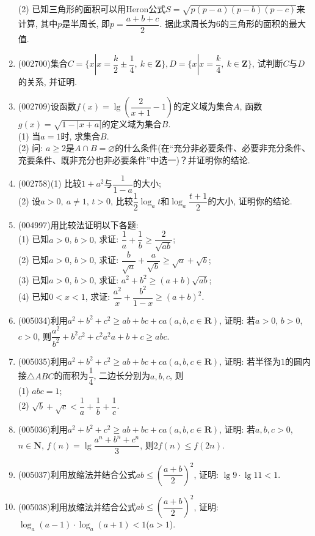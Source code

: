 \documentclass[10pt,a4paper]{article}
\begin{document}
\begin{enumerate}[1.]
(2) 已知三角形的面积可以用Heron公式$S=\sqrt{p(p-a)(p-b)(p-c)}$来计算, 其中$p$是半周长, 即$p=\dfrac{a+b+c}{2}$. 据此求周长为$6$的三角形的面积的最大值.
\item {\tiny (002700)}集合$C=\{x|x=\dfrac k2\pm \dfrac14, \ k\in \mathbf{Z}\},D=\{x|x=\dfrac k4,\ k\in \mathbf{Z}\}$, 试判断$C$与$D$的关系, 并证明.
\vspace*{24ex}
\item {\tiny (002709)}设函数$f(x)=\lg (\dfrac2{x+1}-1)$的定义域为集合$A$, 函数$g(x)=\sqrt{1-|x+a|}$的定义域为集合$B$.\\
(1) 当$a=1$时, 求集合$B$.\\
(2) 问: $a\ge 2$是$A\cap B=\varnothing$的什么条件(在``充分非必要条件、必要非充分条件、充要条件、既非充分也非必要条件''中选一)？并证明你的结论.
\item {\tiny (002758)}(1) 比较$1+a^2$与$\dfrac 1{1-a}$的大小;\\
(2) 设$a>0,\ a\ne 1$, $t>0$, 比较$\dfrac 12\log_at$和$\log_a\dfrac{t+1}2$的大小, 证明你的结论.
\item {\tiny (004997)}用比较法证明以下各题:\\
(1) 已知$a>0$, $b>0$, 求证: $\dfrac 1a+\dfrac 1b\ge \dfrac 2{\sqrt{ab}}$;\\
(2) 已知$a>0$, $b>0$, 求证: $\dfrac b{\sqrt a}+\dfrac a{\sqrt b}\ge \sqrt a+\sqrt b$;\\
(3) 已知$a>0$, $b>0$, 求证: ${a^2}+{b^2}\ge (a+b)\sqrt{ab}$;\\
(4) 已知$0<x<1$, 求证: $\dfrac{a^2}x+\dfrac{b^2}{1-x}\ge (a+b)^2$.
\item {\tiny (005034)}利用$a^2+b^2+c^2\ge ab+bc+ca(a,b,c\in \mathbf{R})$, 证明: 若$a>0$, $b>0$, $c>0$, 则$\dfrac{a^2}{b^2}+{b^2}{c^2}+{c^2}{a^2}{a+b+c}\ge abc$.
\item {\tiny (005035)}利用$a^2+b^2+c^2\ge ab+bc+ca(a,b,c\in \mathbf{R})$, 证明: 若半径为$1$的圆内接$\triangle ABC$的而积为$\dfrac 14$, 二边长分别为$a,b,c$, 则\\(1) $abc=1$;\\
(2) $\sqrt b+\sqrt c<\dfrac 1a+\dfrac 1b+\dfrac 1c$.
\item {\tiny (005036)}利用$a^2+b^2+c^2\ge ab+bc+ca(a,b,c\in \mathbf{R})$, 证明: 若$a,b,c>0$, $n\in \mathbf{N}$, $f(n)=\lg \dfrac{a^n+b^n+c^n}3$, 则$2f(n)\le f(2n)$.
\item {\tiny (005037)}利用放缩法并结合公式$ab\le (\dfrac{a+b}2)^2$, 证明: $\lg 9\cdot \lg 11<1$.
\item {\tiny (005038)}利用放缩法并结合公式$ab\le (\dfrac{a+b}2)^2$, 证明: $\log_a(a-1)\cdot \log_a(a+1)<1$($a>1$).

\end{enumerate}
\end{document}
